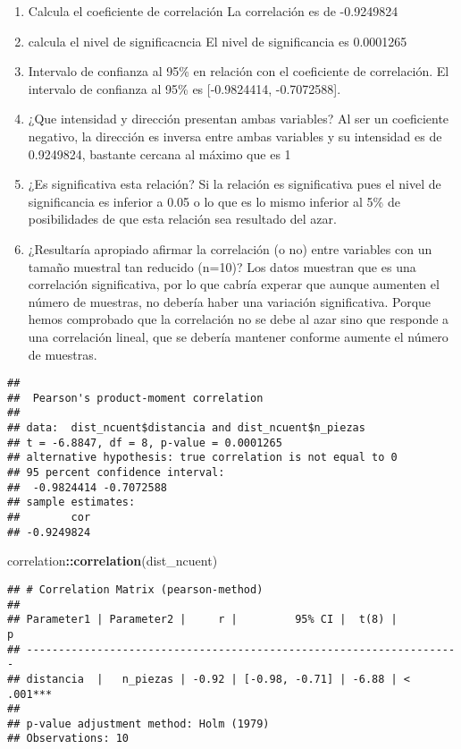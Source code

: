 \documentclass[
]{article}
\newenvironment{Shaded}{\begin{snugshade}}{\end{snugshade}}
\newcommand{\FunctionTok}[1]{\textcolor[rgb]{0.13,0.29,0.53}{\textbf{#1}}}
\newcommand{\NormalTok}[1]{#1}
\newcommand{\SpecialCharTok}[1]{\textcolor[rgb]{0.81,0.36,0.00}{\textbf{#1}}}
\providecommand{\tightlist}{%
  \setlength{\itemsep}{0pt}\setlength{\parskip}{0pt}}
\begin{document}
\begin{enumerate}
\def\labelenumi{\alph{enumi}.}
\setcounter{enumi}{1}
\tightlist
\item
  Calcula el coeficiente de correlación La correlación es de -0.9249824
\item
  calcula el nivel de significacncia El nivel de significancia es
  0.0001265
\item
  Intervalo de confianza al 95\% en relación con el coeficiente de
  correlación. El intervalo de confianza al 95\% es {[}-0.9824414,
  -0.7072588{]}.
\item
  ¿Que intensidad y dirección presentan ambas variables? Al ser un
  coeficiente negativo, la dirección es inversa entre ambas variables y
  su intensidad es de 0.9249824, bastante cercana al máximo que es 1
\item
  ¿Es significativa esta relación? Si la relación es significativa pues
  el nivel de significancia es inferior a 0.05 o lo que es lo mismo
  inferior al 5\% de posibilidades de que esta relación sea resultado
  del azar.
\item
  ¿Resultaría apropiado afirmar la correlación (o no) entre variables
  con un tamaño muestral tan reducido (n=10)? Los datos muestran que es
  una correlación significativa, por lo que cabría experar que aunque
  aumenten el número de muestras, no debería haber una variación
  significativa. Porque hemos comprobado que la correlación no se debe
  al azar sino que responde a una correlación lineal, que se debería
  mantener conforme aumente el número de muestras.
\end{enumerate}

\begin{Shaded}
\end{Shaded}

\begin{verbatim}
## 
##  Pearson's product-moment correlation
## 
## data:  dist_ncuent$distancia and dist_ncuent$n_piezas
## t = -6.8847, df = 8, p-value = 0.0001265
## alternative hypothesis: true correlation is not equal to 0
## 95 percent confidence interval:
##  -0.9824414 -0.7072588
## sample estimates:
##        cor 
## -0.9249824
\end{verbatim}

\begin{Shaded}
\begin{Highlighting}[]
\NormalTok{correlation}\SpecialCharTok{::}\FunctionTok{correlation}\NormalTok{(dist\_ncuent)}
\end{Highlighting}
\end{Shaded}

\begin{verbatim}
## # Correlation Matrix (pearson-method)
## 
## Parameter1 | Parameter2 |     r |         95% CI |  t(8) |         p
## --------------------------------------------------------------------
## distancia  |   n_piezas | -0.92 | [-0.98, -0.71] | -6.88 | < .001***
## 
## p-value adjustment method: Holm (1979)
## Observations: 10
\end{verbatim}
\end{document}
